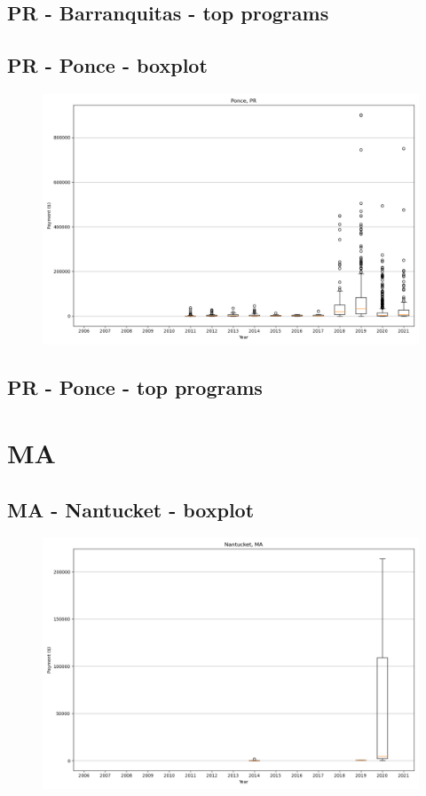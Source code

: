 \subsection*{PR - Barranquitas - top programs}

\newpage
\subsection*{PR - Ponce - boxplot}
\begin{figure}[h]
\centering
\includegraphics[width=7in]{../output/boxplots/counties/Ponce-PR_boxplot.png}
\end{figure}


\subsection*{PR - Ponce - top programs}

\newpage
\section*{MA}
\subsection*{MA - Nantucket - boxplot}
\begin{figure}[h]
\centering
\includegraphics[width=7in]{../output/boxplots/counties/Nantucket-MA_boxplot.png}
\end{figure}


